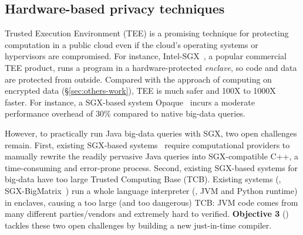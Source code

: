 % 
% 



\vspace{-.15in}\subsection{Hardware-based privacy techniques}
\label{sec:sgx}\vspace{-.075in}

Trusted Execution Environment (TEE) is a promising technique for
protecting computation in a public cloud even if the cloud's operating systems 
or hypervisors are compromised. For instance, Intel-SGX~\cite{intel-sgx}, a 
popular commercial TEE product, runs a program in a hardware-protected 
\emph{enclave}, so code and data are protected from outside. Compared with the 
approach of computing on encrypted data (\S\ref{sec:others-work}), TEE is much 
safer and 100X to 1000X faster. For instance, a SGX-based system 
Opaque~\cite{opaque:nsdi17} incurs a moderate performance overhead of 30\% 
compared to native big-data queries.

However, to practically run Java big-data queries with SGX, two open challenges 
remain. First, existing SGX-based systems~\cite{opaque:nsdi17} require 
computational providers to manually rewrite the readily pervasive Java 
queries into SGX-compatible C++, a time-consuming and error-prone process.
Second, existing SGX-based systems for big-data have too large Trusted 
Computing Base (TCB). Existing systems 
(\eg, SGX-BigMatrix~\cite{bigmatrix:ccs17}) run a whole language interpreter 
(\eg, JVM and Python runtime) in enclaves, causing a too large (and too 
dangerous) TCB: JVM code comes from many different parties/vendors and 
extremely hard to verified. \textbf{Objective 3} () tackles
these two open challenges by building a new just-in-time compiler.

